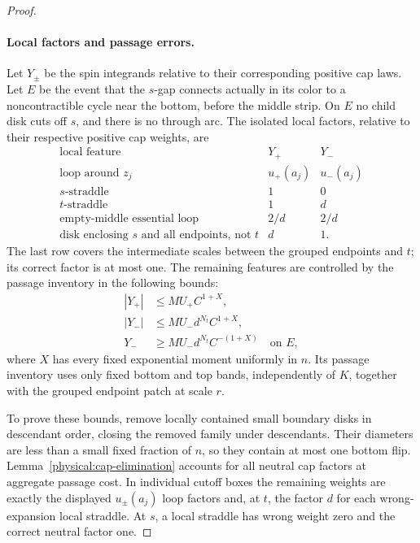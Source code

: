 \begin{proof}
\paragraph{Local factors and passage errors.}
Let \(Y_\pm\) be the spin integrands relative to their corresponding
positive cap laws. Let \(E\) be the event that the \(s\)-gap
connects actually in its color to a noncontractible cycle near the
bottom, before the middle strip. On \(E\) no child disk cuts off
\(s\), and there is no through arc.  The isolated local factors, relative
to their respective positive cap weights, are
\[
\begin{array}{c|cc}
 \text{local feature}&Y_+&Y_-\\ \hline
 \text{loop around }z_j&u_+(a_j)&u_-(a_j)\\
 s\text{-straddle}&1&0\\
 t\text{-straddle}&1&d\\
 \text{empty-middle essential loop}&2/d&2/d\\
 \text{disk enclosing }s\text{ and all endpoints, not }t&d&1.
\end{array}
\]
The last row covers the intermediate scales between the grouped endpoints
and \(t\); its correct factor is at most one.  The remaining features are
controlled by the passage inventory in the following bounds:
\begin{align}
 |Y_+|&\le M U_+ C^{1+X},\label{physical:correct-majorant}\\
 |Y_-|&\le M U_-d^{N_t}C^{1+X},\label{physical:wrong-majorant}\\
 Y_-&\ge M U_-d^{N_t}C^{-(1+X)}\quad\text{on }E,
 \label{physical:wrong-minorant}
\end{align}
where \(X\) has every fixed exponential moment uniformly in \(n\).
Its passage inventory uses only fixed bottom and top bands,
independently of \(K\), together with the grouped endpoint patch
at scale \(r\).

To prove these bounds, remove locally contained small boundary disks
in descendant order, closing the removed family under descendants.
Their diameters are less than a small fixed fraction of \(n\),
so they contain at most one bottom flip. Lemma~\ref{physical:cap-elimination}
accounts for all neutral cap factors at aggregate passage cost.
In individual cutoff boxes the remaining weights are exactly the
displayed \(u_\pm(a_j)\) loop factors and, at \(t\), the factor
\(d\) for each wrong-expansion local straddle. At \(s\), a local
straddle has wrong weight zero and the correct neutral factor one.


\end{proof}

